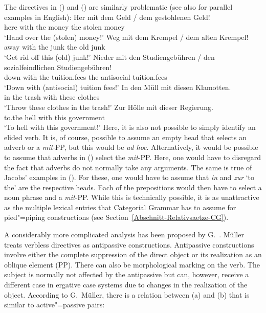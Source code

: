 \begin{exe}
\begin{xlist}[iv.]
\begin{exe}
\begin{xlist}[iv.]
The directives in () and () are similarly problematic (see also  for parallel examples in English):
\eal
\label{Beispiel-Direktiva}
\ex 
\gll Her  mit  dem Geld   / dem gestohlenen Geld!\\
     here with the money {} the stolen money\\
\glt `Hand over the (stolen) money!'
\ex 
\gll Weg  mit  dem Krempel / dem alten Krempel!\\
     away with the junk   {} the old junk\\
\glt `Get rid off this (old) junk!'
\ex 
\gll Nieder mit den Studiengebühren / den sozialfeindlichen Studiengebühren!\\
     down with the tuition.fees  {} the antisocial tuition.fees\\
\glt `Down with (antisocial) tuition fees!'
\zl
\eal
\ex 
\gll In den Müll mit diesen Klamotten.\\
     in the trash with these clothes\\
\glt `Throw these clothes in the trash!'
\ex 
\gll Zur Hölle mit dieser Regierung.\\
	 to.the hell with this government\\
\glt `To hell with this government!'
\zl
Here, it is also not possible to simply identify an
elided verb. It is, of course, possible to assume an empty head that selects an adverb or a 
\emph{mit}-PP, but this would be \emph{ad hoc}.
Alternatively, it would be possible to assume that adverbs in () select the \emph{mit}-PP. Here, one would have to disregard the fact that adverbs
do not normally take any arguments. The same is true of Jacobs' examples in (). For these,
one would have to assume that \emph{in} and \emph{zur} `to the' are the respective heads. Each of
the prepositions would then have to select a noun phrase and a \emph{mit}-PP. While this is technically possible, it is as unattractive
as the multiple lexical entries that Categorial Grammar has to assume for pied"=piping constructions (see Section~\ref{Abschnitt-Relativsaetze-CG}). 

A considerably more complicated analysis has been proposed by G.\ \citet{GMueller2009a}. Müller treats verbless directives as antipassive constructions. 
Antipassive constructions involve either the complete suppression of the direct object or its realization as an oblique element (PP). There
can also be morphological marking on the verb. The subject is normally not affected by the antipassive but can, however, receive a different case
in ergative case systems due to changes in the realization of the object. According to
G.\ Müller, there is a relation between (a) and (b) that is similar to active"=passive pairs:


\end{xlist}
\end{exe}
\end{xlist}
\end{exe}
